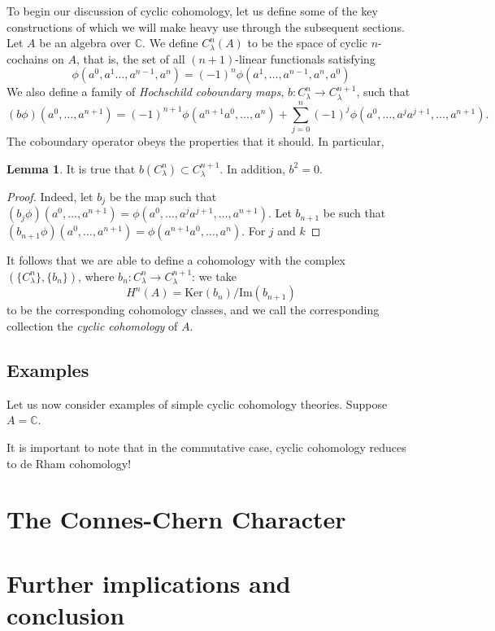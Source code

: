 \documentclass[aps,pra,showpacs,notitlepage,onecolumn,superscriptaddress,nofootinbib]{revtex4-1}
\theoremstyle{definition}
\newtheorem{lemma}{Lemma}[section]
\begin{document}
\noindent To begin our discussion of cyclic cohomology, let us define some of the key constructions of which we will make heavy use through the subsequent sections. Let $A$ be an algebra over $\mathbb{C}$.
We define $C_{\lambda}^{n}(A)$ to be the space of cyclic $n$-cochains on $A$, that is, the set of all $(n + 1)$-linear functionals satisfying
\begin{equation}
  \phi(a^{0}, a^{1} \dots, a^{n - 1}, a^{n}) = (-1)^{n} \phi(a^{1}, \dots, a^{n - 1}, a^n, a^{0})
\end{equation}
We also define a family of \emph{Hochschild coboundary maps}, $b : C_{\lambda}^{n} \rightarrow C_{\lambda}^{n + 1}$, such that
\begin{equation}
  (b \phi)(a^0, \dots, a^{n + 1}) = (-1)^{n + 1} \phi(a^{n + 1} a^{0}, \dots, a^{n}) + \displaystyle\sum_{j = 0}^{n} (-1)^{j} \phi(a^{0}, \dots, a^j a^{j + 1}, \dots, a^{n + 1}).
\end{equation}
The coboundary operator obeys the properties that it should. In particular,
\begin{lemma}
  It is true that $b(C_{\lambda}^{n}) \subset C_{\lambda}^{n + 1}$. In addition, $b^2 = 0$.
\end{lemma}
\begin{proof}
Indeed, let $b_j$ be the map such that $(b_j \phi)(a^{0}, \dots, a^{n + 1}) = \phi(a^{0}, \dots, a^{j} a^{j + 1}, \dots, a^{n + 1})$.
Let $b_{n + 1}$ be such that $(b_{n + 1} \phi)(a^{0}, \dots, a^{n + 1}) = \phi(a^{n + 1} a^{0}, \dots, a^{n})$. For $j$ and $k$
\end{proof}

\noindent It follows that we are able to define a cohomology with the complex $(\{C_{\lambda}^{n}\}, \{b_n\})$, where $b_n : C_{\lambda}^{n} \rightarrow C_{\lambda}^{n + 1}$: we take
\begin{equation}
  H^{n}(A) = \text{Ker}(b_n) / \text{Im}(b_{n + 1})
\end{equation}
to be the corresponding cohomology classes, and we call the corresponding collection the \emph{cyclic cohomology} of $A$.

\subsection{Examples}

\noindent Let us now consider examples of simple cyclic cohomology theories. Suppose $A = \mathbb{C}$.

\noindent It is important to note that in the commutative case, cyclic cohomology reduces to de Rham cohomology!

\section{The Connes-Chern Character}

\section{Further implications and conclusion}
\end{document}
